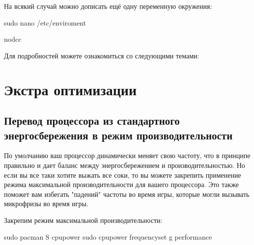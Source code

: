 \documentclass[letterpaper,10pt,russian,openany]{sphinxmanual}
\begin{document}
\sphinxAtStartPar
На всякий случай можно дописать ещё одну переменную окружения:

\begin{sphinxVerbatim}[commandchars=\\\{\}]
sudo nano /etc/enviroment

nodcc
\end{sphinxVerbatim}

\sphinxAtStartPar
Для подробностей можете ознакомиться со следующими темами:

\sphinxAtStartPar
{}

\sphinxAtStartPar
{}

\sphinxstepscope


\chapter{Экстра оптимизации}
\label{\detokenize{source/extra-optimizations:extra-optimizations}}\label{\detokenize{source/extra-optimizations:id1}}\label{\detokenize{source/extra-optimizations::doc}}
\ignorespaces 

\section{Перевод процессора из стандартного энергосбережения в режим производительности}
\label{\detokenize{source/extra-optimizations:maximum-cpu-performance}}\label{\detokenize{source/extra-optimizations:index-0}}\label{\detokenize{source/extra-optimizations:id2}}
\sphinxAtStartPar
По умолчанию ваш процессор динамически меняет свою частоту, что в принципе правильно и дает баланс между энергосбережением и производительностью.
Но если вы все таки хотите выжать все соки, то вы можете закрепить применение режима максимальной производительности для вашего процессора.
Это также поможет вам избегать "падений" частоты во время игры, которые могли вызывать микрофризы во время игры.

\sphinxAtStartPar
Закрепим режим максимальной производительности:

\begin{sphinxVerbatim}[commandchars=\\\{\}]
sudo pacman \PYGZhy{}S cpupower                       
sudo cpupower frequency\PYGZhy{}set \PYGZhy{}g performance    
\end{sphinxVerbatim}
\end{document}
